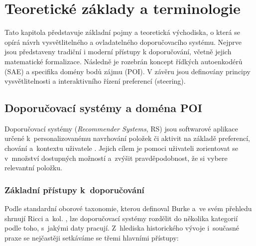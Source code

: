 \chapter{Teoretické základy a terminologie}
\label{chap:teorie}

Tato kapitola představuje základní pojmy a teoretická východiska, o která se opírá návrh vysvětlitelného a ovladatelného doporučovacího systému. Nejprve jsou představeny tradiční i moderní přístupy k doporučování, včetně jejich matematické formalizace. Následně je rozebrán koncept řídkých autoenkodérů (SAE) a specifika domény bodů zájmu (POI). V závěru jsou definovány principy vysvětlitelnosti a interaktivního řízení preferencí (steering).

\section{Doporučovací systémy a doména POI}
\label{sec:rs_zaklady}

Doporučovací systémy (\textit{Recommender Systems}, RS) jsou softwarové aplikace určené k~personalizovanému navrhování položek či aktivit na základě preferencí, chování a~kontextu uživatele \cite{RicciRokachShapira2022}. Jejich cílem je pomoci uživateli zorientovat se v~množství dostupných možností a~zvýšit pravděpodobnost, že si vybere relevantní položku.


\subsection{Základní přístupy k~doporučování}
\label{subsec:zakladni_pristupy}

Podle standardní oborové taxonomie, kterou definoval Burke \cite{Burke2007} a~ve svém přehledu shrnují Ricci a~kol. \cite{RicciRokachShapira2022}, lze doporučovací systémy rozdělit do několika kategorií podle toho, s~jakými daty pracují. Z~hlediska historického vývoje i~současné praxe se nejčastěji setkáváme se třemi hlavními přístupy:

